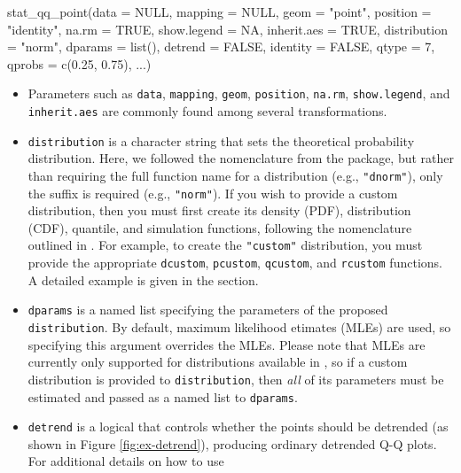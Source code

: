 \begin{Schunk}
\begin{Sinput}
stat_qq_point(data = NULL,
              mapping = NULL,
              geom = "point",
              position = "identity",
              na.rm = TRUE,
              show.legend = NA,
              inherit.aes = TRUE,
              distribution = "norm",
              dparams = list(),
              detrend = FALSE,
              identity = FALSE,
              qtype = 7,
              qprobs = c(0.25, 0.75),
              ...)
\end{Sinput}
\end{Schunk}

\begin{itemize}
\item
  Parameters such as \texttt{data}, \texttt{mapping}, \texttt{geom},
  \texttt{position}, \texttt{na.rm}, \texttt{show.legend}, and
  \texttt{inherit.aes} are commonly found among several 
  transformations.
\item
  \texttt{distribution} is a character string that sets the theoretical
  probability distribution. Here, we followed the nomenclature from the
   package, but rather than requiring the full function name
  for a distribution (e.g., \texttt{"dnorm"}), only the suffix is
  required (e.g., \texttt{"norm"}). If you wish to provide a custom
  distribution, then you must first create its density (PDF),
  distribution (CDF), quantile, and simulation functions, following the
  nomenclature outlined in . For example, to create the
  \texttt{"custom"} distribution, you must provide the appropriate
  \texttt{dcustom}, \texttt{pcustom}, \texttt{qcustom}, and
  \texttt{rcustom} functions. A detailed example is given in the
   section.
\item
  \texttt{dparams} is a named list specifying the parameters of the
  proposed \texttt{distribution}. By default, maximum likelihood
  etimates (MLEs) are used, so specifying this argument overrides the
  MLEs. Please note that MLEs are currently only supported for
  distributions available in , so if a custom distribution is
  provided to \texttt{distribution}, then \emph{all} of its parameters
  must be estimated and passed as a named list to \texttt{dparams}.
\item
  \texttt{detrend} is a logical that controls whether the points should
  be detrended (as shown in Figure \ref{fig:ex-detrend}), producing
  ordinary detrended Q-Q plots. For additional details on how to use

\end{itemize}
